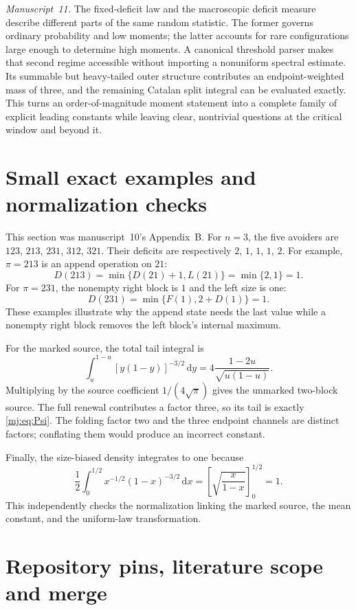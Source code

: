 \documentclass[11pt,a4paper]{article}
\theoremstyle{definition}\newaliascnt{definition}{theorem}
\theoremstyle{remark}\newaliascnt{remark}{theorem}
\newcommand{\dd}{\mathrm d}
\begin{document}
\emph{Manuscript~11.} The fixed-deficit law and the macroscopic deficit
measure describe different parts of the same random statistic. The former
governs ordinary probability and low moments; the latter accounts for rare
configurations large enough to determine high moments. A canonical threshold
parser makes that second regime accessible without importing a nonuniform
spectral estimate. Its summable but heavy-tailed outer structure contributes
an endpoint-weighted mass of three, and the remaining Catalan split integral
can be evaluated exactly. This turns an order-of-magnitude moment statement
into a complete family of explicit leading constants while leaving clear,
nontrivial questions at the critical window and beyond it.

\section{Small exact examples and normalization checks}
\label{mj:sec:small}
This section was manuscript~10's Appendix~B. For $n=3$, the five avoiders are
$123$, $213$, $231$, $312$, $321$. Their deficits are respectively $2$, $1$,
$1$, $1$, $2$. For
example, $\pi=213$ is an append operation on $21$:
\[
 D(213)=\min\{D(21)+1,L(21)\}=\min\{2,1\}=1.
\]
For $\pi=231$, the nonempty right block is $1$ and the left size is one:
\[
 D(231)=\min\{F(1),2+D(1)\}=1.
\]
These examples illustrate why the append state needs the last value while a
nonempty right block removes the left block's internal maximum.

For the marked source, the total tail integral is
\[
 \int_u^{1-u}[y(1-y)]^{-3/2}\,\dd y
 =4\frac{1-2u}{\sqrt{u(1-u)}}.
\]
Multiplying by the source coefficient $1/(4\sqrt\pi)$ gives the unmarked
two-block source. The full renewal contributes a factor three, so its tail is
exactly \eqref{mj:eq:Psi}. The folding factor two and the three endpoint
channels are distinct factors; conflating them would produce an incorrect
constant.

Finally, the size-biased density integrates to one because
\[
 \frac12\int_0^{1/2}x^{-1/2}(1-x)^{-3/2}\,\dd x
 =\left[\sqrt{\frac{x}{1-x}}\right]_0^{1/2}=1.
\]
This independently checks the normalization linking the marked source, the
mean constant, and the uniform-law transformation.

\section{Repository pins, literature scope and merge}
\label{mj:sec:provenance}
\end{document}
